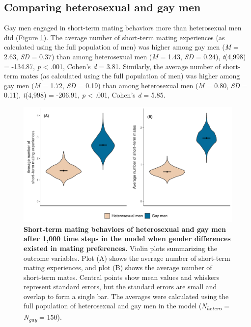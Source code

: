 \documentclass[
  11pt,
]{article}
\begin{document}
\hypertarget{comparing-heterosexual-and-gay-men}{%
\subsection{Comparing heterosexual and gay
men}\label{comparing-heterosexual-and-gay-men}}

Gay men engaged in short-term mating behaviors more than heterosexual
men did (Figure \ref{fig:hetero_vs_gay}). The average number of
short-term mating experiences (as calculated using the full population
of men) was higher among gay men (\emph{M} = 2.63, \emph{SD} = 0.37)
than among heterosexual men (\emph{M} = 1.43, \emph{SD} = 0.24),
\emph{t}(4,998) = -134.87, \emph{p} \textless{} .001, Cohen's \emph{d} =
3.81. Similarly, the average number of short-term mates (as calculated
using the full population of men) was higher among gay men (\emph{M} =
1.72, \emph{SD} = 0.19) than among heterosexual men (\emph{M} = 0.80,
\emph{SD} = 0.11), \emph{t}(4,998) = -206.91, \emph{p} \textless{} .001,
Cohen's \emph{d} = 5.85.

\begin{figure}[h]
  \centering
  \includegraphics[width=0.8\columnwidth]{figures/fig3_hetero_vs_gay_men.pdf}
  \caption{\textbf{Short-term mating behaviors of heterosexual and gay men after 1,000 time steps in the model when gender differences existed in mating preferences.} Violin plots summarizing the outcome variables. Plot (A) shows the average number of short-term mating experiences, and plot (B) shows the average number of short-term mates. Central points show mean values and whiskers represent standard errors, but the standard errors are small and overlap to form a single bar. The averages were calculated using the full population of heterosexual and gay men in the model (\textit{N\textsubscript{hetero}} = \textit{N\textsubscript{gay}} = 150).}
  \label{fig:hetero_vs_gay}
\end{figure}
\end{document}
